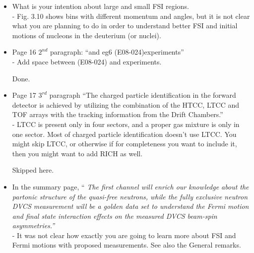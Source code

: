 \begin{itemize}
  \item What is your intention about large and small FSI regions. \\
  - Fig. 3.10 shows bins with different momentum and angles, but it is not clear what you are planning to do in order to understand better FSI and initial motions of nucleons in the deuterium (or nuclei).
  
  \item Page 16 $2^{nd}$ paragraph: ``and eg6 (E08-024)experiments'' \\
  - Add space between (E08-024) and experiments.
     
     {\color{red} Done.}
  
 \item Page 17 $3^{rd}$ paragraph ``The charged particle identification in the 
    forward detector is achieved by utilizing the combination of the HTCC, LTCC 
    and TOF arrays with the tracking information from the Drift Chambers.'' \\
- LTCC is present only in four sectors, and a proper gas mixture is only in one 
  sector. Most of charged particle identification doesn't use LTCC. You might 
  skip LTCC, or otherwise if for completeness you want to include it, then you 
  might want to add RICH as well.
  
     {\color{red} Skipped here.}


\item In the summary page, ``\textit{ The first channel will enrich our 
   knowledge about the partonic structure of the quasi-free neutrons, while the 
   fully exclusive neutron DVCS measurement will be a golden data set to 
   understand the Fermi motion and final state interaction effects on the 
   measured DVCS beam-spin asymmetries.''}\\
- It was not clear how exactly you are going to learn more about FSI and Fermi motions with proposed measurements. See also the General remarks.

\end{itemize}
 


